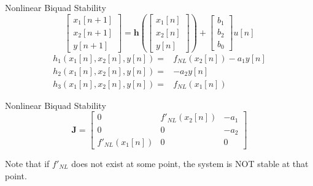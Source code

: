 \begin{frame}{Nonlinear Biquad Stability}
    \begin{equation}
        \begin{bmatrix} x_1[n+1] \\ x_2[n+1] \\ y[n+1] \end{bmatrix} =
        \mathbf{h} \left( \begin{bmatrix} x_1[n] \\ x_2[n] \\ y[n] \end{bmatrix}
        \right) + \begin{bmatrix} b_1\\ b_2\\ b_0 \end{bmatrix} u[n]
    \end{equation}
    \vspace{3ex}
    \begin{equation}
        \begin{split}
            h_1(x_1[n], x_2[n], y[n]) =& f_{NL}(x_2[n]) - a_1y[n] \\
            h_2(x_1[n], x_2[n], y[n]) =& -a_2y[n] \\
            h_3(x_1[n], x_2[n], y[n]) =& f_{NL}(x_1[n])
        \end{split}
    \end{equation}
\end{frame}

\begin{frame}{Nonlinear Biquad Stability}
    \begin{equation}
        \mathbf{J} = \begin{bmatrix}
            0& f'_{NL}(x_2[n])& -a_1 \\
            0& 0& -a_2 \\
            f'_{NL}(x_1[n])& 0& 0
        \end{bmatrix}
    \end{equation}

    \vspace{3ex}

    Note that if $f'_{NL}$ does not exist at some point,
    the system is NOT stable at that point.
\end{frame}


